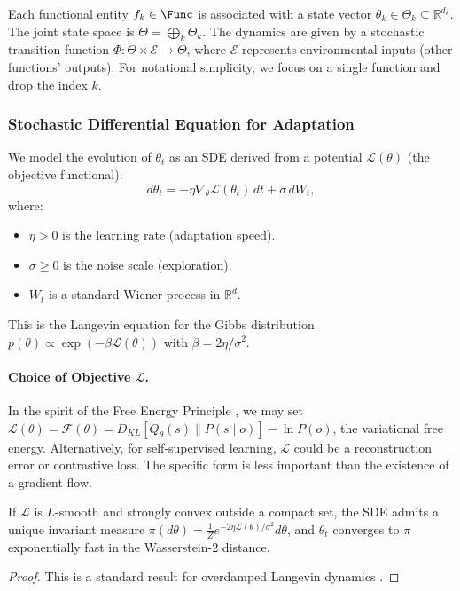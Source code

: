 \begin{definition}
Each functional entity $f_k \in \Func$ is associated with a state vector $\theta_k \in \Theta_k \subseteq \mathbb{R}^{d_k}$. The joint state space is $\Theta = \bigoplus_k \Theta_k$. The dynamics are given by a stochastic transition function $\Phi: \Theta \times \mathcal{E} \to \Theta$, where $\mathcal{E}$ represents environmental inputs (other functions' outputs). For notational simplicity, we focus on a single function and drop the index $k$.
\end{definition}

\subsubsection{Stochastic Differential Equation for Adaptation}
We model the evolution of $\theta_t$ as an SDE derived from a potential $\mathcal{L}(\theta)$ (the objective functional):
\[
d\theta_t = -\eta \nabla_\theta \mathcal{L}(\theta_t) \, dt + \sigma \, dW_t,
\]
where:
\begin{itemize}
    \item $\eta > 0$ is the learning rate (adaptation speed).
    \item $\sigma \ge 0$ is the noise scale (exploration).
    \item $W_t$ is a standard Wiener process in $\mathbb{R}^d$.
\end{itemize}
This is the Langevin equation for the Gibbs distribution $p(\theta) \propto \exp(-\beta \mathcal{L}(\theta))$ with $\beta = 2\eta/\sigma^2$.

\paragraph{Choice of Objective $\mathcal{L}$.}
In the spirit of the Free Energy Principle \cite{friston2010}, we may set $\mathcal{L}(\theta) = \mathcal{F}(\theta) = D_{KL}[Q_\theta(s) \| P(s \mid o)] - \ln P(o)$, the variational free energy. Alternatively, for self-supervised learning, $\mathcal{L}$ could be a reconstruction error or contrastive loss. The specific form is less important than the existence of a gradient flow.

\begin{proposition}
If $\mathcal{L}$ is $L$-smooth and strongly convex outside a compact set, the SDE admits a unique invariant measure $\pi(d\theta) = \frac{1}{Z} e^{-2\eta \mathcal{L}(\theta)/\sigma^2} d\theta$, and $\theta_t$ converges to $\pi$ exponentially fast in the Wasserstein-2 distance.
\end{proposition}
\begin{proof}
This is a standard result for overdamped Langevin dynamics \cite{roberts1996exponential}.
\end{proof}

